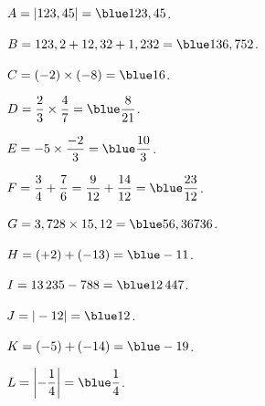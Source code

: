 \ \\
   \vspace*{-9mm}
   \begin{multicols}{2}
      \begin{bigenumerate}
         \item $A =|123,45| ={\blue 123,45}$. \\ [3mm]
         \item $B =123,2+12,32+1,232 ={\blue 136,752}$. \\ [3mm]
         \item $C =(-2)\times(-8) ={\blue 16}$. \\ [3mm]
         \item $D =\dfrac{2}{3}\times\dfrac{4}{7} = {\blue \dfrac{8}{21}}$. \\ [3mm]
         \item $E =-5\times\dfrac{-2}{3} ={\blue \dfrac{10}{3}}$. \\ [3mm]
         \item $F=\dfrac{3}{4}+\dfrac{7}{6} =\dfrac{9}{12}+\dfrac{14}{12} ={\blue \dfrac{23}{12}}$. \\ [3mm]
         \item $G =3,728\times15,12 ={\blue 56,36736}$. \\ [3mm]
         \item $H =(+2)+(-13) ={\blue -11}$. \\ [3mm]
         \item $I =13\,235-788 ={\blue 12\,447}$. \\ [3mm]
         \item $J =|-12| ={\blue 12}$. \\ [3mm]
         \item $K =(-5)+(-14) ={\blue -19}$. \\ [3mm]
         \item $L =\left|-\dfrac14\right| ={\blue \dfrac14}$.
      \end{bigenumerate}
   \end{multicols}
